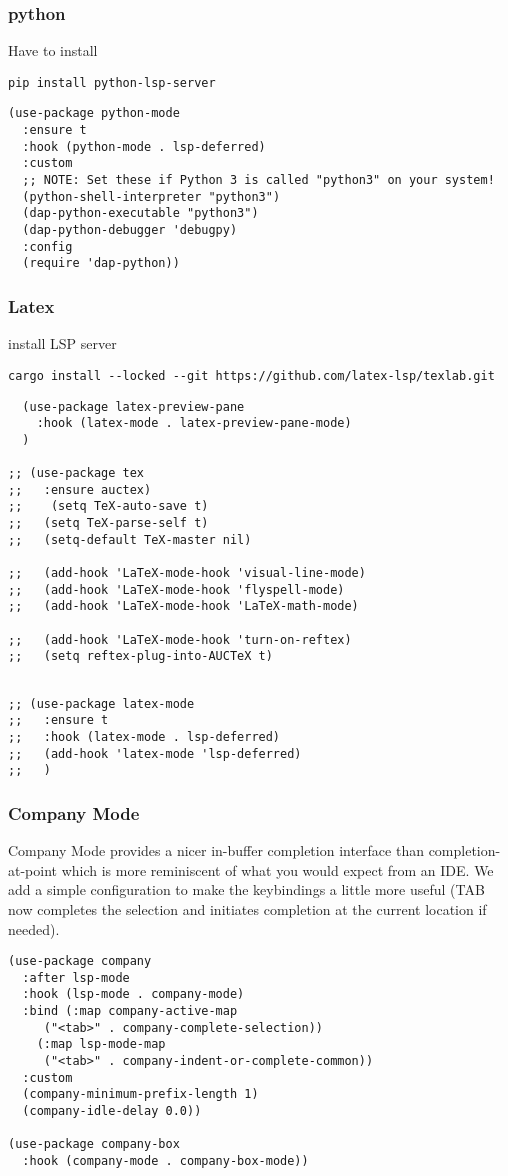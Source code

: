 \documentclass[11pt]{article}
\begin{document}
\subsubsection{python}
\label{sec:org717331e}
Have to install
\begin{verbatim}
pip install python-lsp-server
\end{verbatim}


\begin{verbatim}
(use-package python-mode
  :ensure t
  :hook (python-mode . lsp-deferred)
  :custom
  ;; NOTE: Set these if Python 3 is called "python3" on your system!
  (python-shell-interpreter "python3")
  (dap-python-executable "python3")
  (dap-python-debugger 'debugpy)
  :config
  (require 'dap-python))
\end{verbatim}

\subsubsection{Latex}
\label{sec:orgeae761f}
install LSP server
\begin{verbatim}
cargo install --locked --git https://github.com/latex-lsp/texlab.git
\end{verbatim}

\begin{verbatim}
  (use-package latex-preview-pane
    :hook (latex-mode . latex-preview-pane-mode)
  )

;; (use-package tex
;;   :ensure auctex)
;;    (setq TeX-auto-save t)
;;   (setq TeX-parse-self t)
;;   (setq-default TeX-master nil)

;;   (add-hook 'LaTeX-mode-hook 'visual-line-mode)
;;   (add-hook 'LaTeX-mode-hook 'flyspell-mode)
;;   (add-hook 'LaTeX-mode-hook 'LaTeX-math-mode)

;;   (add-hook 'LaTeX-mode-hook 'turn-on-reftex)
;;   (setq reftex-plug-into-AUCTeX t)


\end{verbatim}

\begin{verbatim}
;; (use-package latex-mode
;;   :ensure t
;;   :hook (latex-mode . lsp-deferred)
;;   (add-hook 'latex-mode 'lsp-deferred)
;;   )
\end{verbatim}
\subsubsection{Company Mode}
\label{sec:org78673a7}
Company Mode provides a nicer in-buffer completion interface than completion-at-point which is more reminiscent of what you would expect from an IDE. We add a simple configuration to make the keybindings a little more useful (TAB now completes the selection and initiates completion at the current location if needed).
\begin{verbatim}
(use-package company
  :after lsp-mode
  :hook (lsp-mode . company-mode)
  :bind (:map company-active-map
	 ("<tab>" . company-complete-selection))
	(:map lsp-mode-map
	 ("<tab>" . company-indent-or-complete-common))
  :custom
  (company-minimum-prefix-length 1)
  (company-idle-delay 0.0))

(use-package company-box
  :hook (company-mode . company-box-mode))
\end{verbatim}
\end{document}
